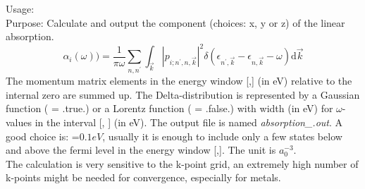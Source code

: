 {
  \noindent
  Usage:         \\[1.0ex]
  Purpose: Calculate and output the  component (choices: x, y or z) of the linear absorption. 
  \begin{equation}
   \alpha_{i}(\omega))=\frac{1}{\pi \omega}\sum_{n,n^{'}}\int_{\vec{k}}\left|p_{i;n^{'},n,\vec{k}}\right|^2\delta(\epsilon_{n^{'},\vec{k}}-\epsilon_{n,\vec{k}}-\omega)\mathrm{d}\vec{k}
  \end{equation}
  The momentum matrix elements in the energy window [,] (in eV) relative to the internal zero are summed up. The Delta-distribution is 
  represented by a Gaussian function ( = .true.) or a Lorentz function ( = .false.) with width  (in eV) 
  for  $\omega$-values in the interval [, ] (in eV). The output file is named \textit{absorption\_}\textit{.out}. 
  A good choice is: =$0.1eV$, usually it is enough to include only a few states below and above the fermi level in the 
  energy window [,]. The unit is $a_0^{-3}$.\\
  The calculation is very sensitive to the k-point grid, an extremely high number of k-points might be needed for convergence, especially for metals.\\[1.0ex]
}
